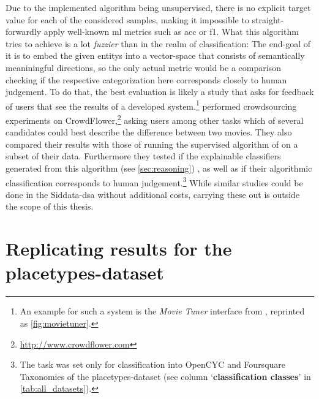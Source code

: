 Due to the implemented algorithm being unsupervised, there is no explicit target value for each of the considered samples, making it impossible to straight-forwardly apply well-known \gls{ml} metrics such as \Gls{acc} or \gls{f1}. What this algorithm tries to achieve is a lot \textit{fuzzier} than in the realm of classification: The end-goal of it is to embed the given \glspl{entity} into a vector-space that consists of semantically meaniningful directions, so the only actual metric would be a comparison checking if the respective categorization here corresponds closely to human judgement. To do that, the best evaluation is likely a study that asks for feedback of users that see the results of a developed system.\footnote{An example for such a system is the \textit{Movie Tuner} interface from \cite{VISR12}, reprinted as \autoref{fig:movietuner}.} \textcite{Derrac2015} performed crowdsourcing experiments on CrowdFlower,\footnote{\url{http://www.crowdflower.com}} asking users among other tasks which of several candidates could best describe the difference between two movies. They also compared their results with those of running the supervised algorithm of \cite{VISR12} on a subset of their data. Furthermore they tested if the explainable classifiers generated from this algorithm (see \autoref{sec:reasoning})  \cite[48]{Derrac2015}, as well as if their algorithmic classification corresponds to human judgement.\footnote{The task was set only for classification into OpenCYC and Foursquare Taxonomies of the placetypes-dataset (see column `\textbf{classification classes}' in \autoref{tab:all_datasets}).} 
While similar studies could be done in the Siddata-\gls{dsa} \cite{Schurz2021} without additional costs, carrying these out is outside the scope of this thesis.



\section{Replicating results for the placetypes-dataset}
\label{sec:results_placetypes}


